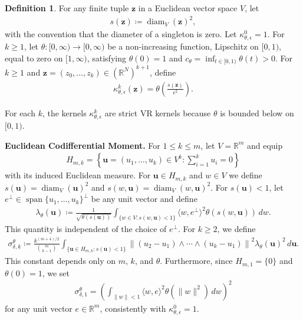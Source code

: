 \documentclass[11pt,reqno]{amsproc}
\numberwithin{equation}{section}
\newcommand{\R}{\mathbb{R}}
\newcommand{\bz}{\mathbf{z}}
\newcommand{\bu}{\mathbf{u}}
\newcommand{\diam}{\operatorname{diam}}
\newcommand{\spann}{\operatorname{span}}
\theoremstyle{definition}
\newtheorem{definition}[counter]{Definition}
\theoremstyle{plain}
\begin{document}
    \begin{definition} \label{def:codiff_kernel}
        \label{not:codiff_kernel_table}
        For any finite tuple $\bz$ in a Euclidean vector space $V$, let
        \begin{align} \label{eq:s_squared_diameter_convention}
            s(\bz)\coloneqq\diam_V(\bz)^2,
        \end{align}
        with the convention that the diameter of a singleton is zero. Let $\kappa_{\theta,\epsilon}^0 = 1$. For $k \geq 1$, let $\theta: [0,\infty) \to [0,\infty)$ be a non-increasing function, Lipschitz on $[0,1)$, equal to zero on $[1,\infty)$, satisfying $\theta(0)=1$ and $c_\theta = \inf_{t \in [0,1)} \theta(t) > 0$. For $k\geq 1$ and $\bz=(z_0,\ldots,z_k)\in (\R^N)^{k+1}$, define
        \begin{align} \label{eq:codiff_kappa_def}
            \kappa^k_{\theta,\epsilon}(\bz) = \theta\left(\frac{s(\bz)}{\epsilon^2}\right).
        \end{align}
    \end{definition}
    For each $k$, the kernels $\kappa^k_{\theta,\epsilon}$ are strict VR kernels because $\theta$ is bounded below on $[0,1)$. 

    \medskip
    \noindent\textbf{Euclidean Codifferential Moment.}
        For $1\leq k\leq m$, let $V=\R^m$ and equip
        \begin{align}
            H_{m,k}=\left\{\bu=(u_1,\ldots,u_k)\in V^k:\sum_{i=1}^k u_i=0\right\}
        \end{align}
        with its induced Euclidean measure. For $\bu\in H_{m,k}$ and $w\in V$ we define $s(\bu)=\diam_V(\bu)^2$ and $s(w,\bu)=\diam_V(w,\bu)^2$.
        For $s(\bu)<1$, let $e^\perp\in\spann\{u_1,\ldots,u_k\}^\perp$ be any unit vector and define
        \begin{align}
            \lambda_\theta(\bu)
            \coloneqq
            \frac{1}{\sqrt{\theta(s(\bu))}}
            \int_{\{w\in V:s(w,\bu)<1\}}
            \langle w,e^\perp\rangle^2\theta(s(w,\bu))\,dw.
        \end{align}
        This quantity is independent of the choice of $e^\perp$. For $k \geq 2$, we define 
        \begin{align} \label{eq:codifferential_moment_constant}
            \sigma^\theta_{\delta,k}
            \coloneqq
            \frac{k^{(m+4)/2}}{\binom{m}{k-1}}
            \int_{\{\bu\in H_{m,k}:s(\bu)<1\}}
            \left\|(u_2-u_1)\wedge\cdots\wedge(u_k-u_1)\right\|^2
            \lambda_\theta(\bu)^2\,d\bu.
        \end{align}
        This constant depends only on $m$, $k$, and $\theta$. Furthermore, since $H_{m,1}=\{0\}$ and $\theta(0)=1$, we set
        \begin{align}
            \sigma^\theta_{\delta,1}
            =
            \left(\int_{\|w\|<1}\langle w,e\rangle^2\theta(\|w\|^2)\,dw\right)^2
        \end{align}
        for any unit vector $e\in\R^m$, consistently with $\kappa^0_{\theta,\epsilon}=1$.
    \medskip
\end{document}
